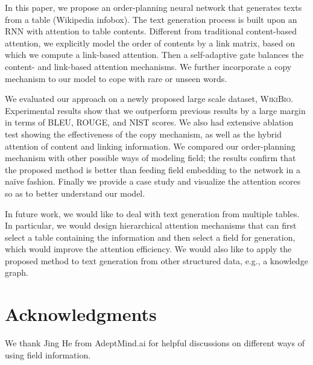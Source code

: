 \documentclass[letterpaper]{article} %
\begin{document}
In this paper, we propose an order-planning neural network that generates texts from a table (Wikipedia infobox). The text generation process is built upon an RNN with attention to table contents. Different from traditional content-based attention, we explicitly model the order of contents by a link matrix, based on which we compute a link-based attention. Then a self-adaptive gate balances the content- and link-based attention mechanisms. We further incorporate a copy mechanism to our model to cope with rare or unseen words.

We evaluated our approach on a newly proposed large scale dataset, \textsc{WikiBio}. Experimental results show that we outperform previous results by a large margin in terms of BLEU, ROUGE, and NIST scores. We also had extensive ablation test showing the effectiveness of the copy mechanism, as well as the hybrid attention of content and linking information. We compared our order-planning mechanism with other possible ways of modeling field; the results confirm that the proposed method is better than feeding field embedding to the network in a na\"ive fashion.
Finally we provide a case study and visualize the attention scores so as to better understand our model.

In future work, we would like to deal with text generation from multiple tables. In particular, we would design hierarchical attention mechanisms that can first select a table containing the information and then select a field for generation, which would improve the attention efficiency. We would also like to apply the proposed method to text generation from other structured data, e.g., a knowledge graph.

\section{Acknowledgments}
We thank Jing He from AdeptMind.ai for helpful discussions on different ways of using field information. %


\end{document}
